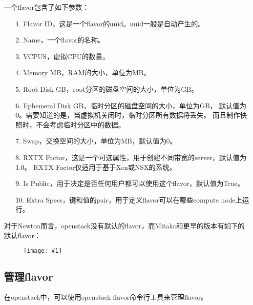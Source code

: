 \documentclass[a4paper,left=1.5cm,right=1.5cm,11pt]{article}
\newcommand{\fic}[1]{\begin{figure}[H]
		\center
		\texttt{[image: \#1]}
	\end{figure}}
\begin{document}
    一个flavor包含了如下参数：
    \begin{itemize}
        \item[1.] Flavor ID，这是一个flavor的uuid。uuid一般是自动产生的。
        \item[2.] Name，一个flavor的名称。
        \item[3.] VCPUS，虚拟CPU的数量。
        \item[4.] Memory MB，RAM的大小，单位为MB。
        \item[5.] Root Disk GB，root分区的磁盘空间的大小，单位为GB。
        \item[6.] Ephemeral Disk GB，临时分区的磁盘空间的大小，单位为GB，
                  默认值为0。需要知道的是，当虚拟机关闭时，临时分区所有数据将丢失。
                  而且制作快照时，不会考虑临时分区中的数据。
        \item[7.] Swap，交换空间的大小，单位为MB，默认值为0。
        \item[8.] RXTX Factor，这是一个可选属性，用于创建不同带宽的server，默认值为1.0。
                  RXTX Factor仅适用于基于Xen或NSX的系统。
        \item[9.] Is Public，用于决定是否任何用户都可以使用这个flavor，默认值为True。
        \item[10.] Extra Specs，键和值的pair，用于定义flavor可以在哪些compute node上运行。
    \end{itemize}

    对于Newton而言，openstack没有默认的flavor，而Mitaka和更早的版本有如下的默认flavor：
    \fic{1.png}

\subsection{管理flavor}
    在openstack中，可以使用openstack flavor命令行工具来管理flavor。\par
\end{document}
